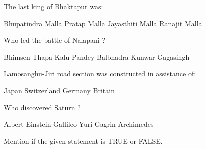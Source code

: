 \begin{questions}
\question The last king of Bhaktapur was:
  \begin{choices}
  \choice Bhupatindra Malla
  \choice Pratap Malla
  \choice Jayasthiti Malla
  \choice Ranajit Malla
  \end{choices}

\question Who led the battle of Nalapani ?
  \begin{choices}
  \choice Bhimsen Thapa
  \choice Kalu Pandey
  \choice Balbhadra Kunwar
  \choice Gagasingh
  \end{choices}

\question Lamosanghu-Jiri road section was constructed in assistance of:
  \begin{choices}
  \choice Japan
  \choice Switzerland
  \choice Germany
  \choice Britain
  \end{choices}

\question Who discovered Saturn ?
  \begin{choices}
  \choice Albert Einstein
  \choice Gallileo
  \choice Yuri Gagrin
  \choice Archimedes
  \end{choices}

\question Mention if the given statement is TRUE or FALSE.

\end{questions}


